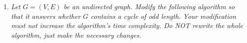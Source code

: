 \documentclass[12pt,oneside,reqno]{amsart}
\makeatletter
\theoremstyle{plain}
\theoremstyle{definition}
\theoremstyle{remark}
\newcommand{\bb}{\vspace{3mm}}
\newenvironment{restoretext}%
    {\@parboxrestore%
     \begin{adjustwidth}{}{\leftmargin}%
    }{\end{adjustwidth}
     }
\makeatother
\begin{document}
\begin{enumerate}[label=\arabic*.]
\begin{comment}
\bb
\begin{restoretext}
\begin{algorithm}[H]\label{alg2}
\KwData{The set of vertices $V$ and edges $E$ of the given graph $G$. }
\KwResult{The list $L$ of the topological ordering of $G$. }
\Begin{
\tcc{Assume $V = \Set{1,2,...,n}$. }
\tcc{global array $visited[1..n]$}
\tcc{global array $topSort[1..n]$}
$visited[1..n] \longleftarrow 0$\;
$topSort[1..n] \longleftarrow 0$\;
\For{$i \longleftarrow 1$ \KwTo $n$}{
	\If{$visited[i] = 0$}{
		dfs$(v)$\;
	}
}
}
\caption{dfs$(G)$}
\end{algorithm}
\end{restoretext}
\bb

\end{comment}








\bb








\item \textit{Let $G = (V,E)$ be an undirected graph. Modify the following algorithm so that it answers whether $G$ contains a cycle of odd length. Your modification must not increase the algorithm's time complexity. Do NOT rewrite the whole algorithm, just make the necessary changes. }


\begin{comment}



\bb
\begin{restoretext}
\begin{algorithm}[H]\label{alg3}
\Begin{
\tcc{Assume $V = \Set{1,2,...,n}$. }
\tcc{global variables: $oddCycle$, $visited[1..n]$, $ancestorLevel$, $level$}
\tcc{$oddCycle$ is a boolean variable, $visited$ is an integer array, $ancestorLevel$ is a Map object of type <Integer,Integer>, and $level$ is an integer.}
$visited[1..n] \longleftarrow 0$\;
$level \longleftarrow 0$\;
$oddCycle \longleftarrow$ \textbf{false}\;
\For{$i \longleftarrow 1$ \KwTo $n$}{
	\If{$visited[i] = 0$}{
		$ancestorLevel$.addKeyPair$(i,level)$\;
		dfs$(i)$\;
	}
	$ancestorLevel$.deleteKeyPair$(i)$\;
}
\Return $oddCycle$\;
}
\caption{Search$(G = (V,E))$}
\end{algorithm}
\end{restoretext}
\bb


\end{comment}
\end{enumerate}
\end{document}

